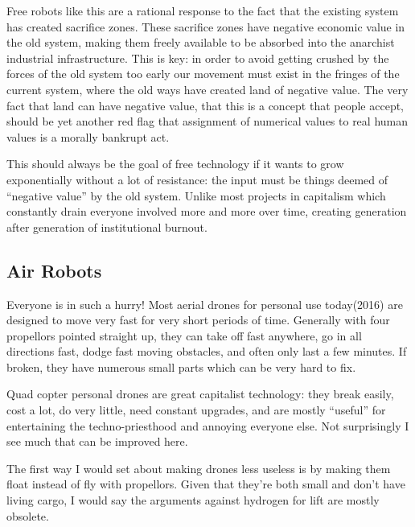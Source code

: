 Free robots like this are a rational response to the fact that the
existing system has created sacrifice zones. These sacrifice zones have
negative economic value in the old system, making them freely available
to be absorbed into the anarchist industrial infrastructure. This is
key: in order to avoid getting crushed by the forces of the old system
too early our movement must exist in the fringes of the current system,
where the old ways have created land of negative value. The very fact
that land can have negative value, that this is a concept that people
accept, should be yet another red flag that assignment of numerical
values to real human values is a morally bankrupt act.

This should always be the goal of free technology if it wants to grow
exponentially without a lot of resistance: the input must be things
deemed of ``negative value'' by the old system. Unlike most projects in
capitalism which constantly drain everyone involved more and more over
time, creating generation after generation of institutional burnout.

\subsection{Air Robots}\label{air-robots}

Everyone is in such a hurry! Most aerial drones for personal use
today(2016) are designed to move very fast for very short periods of
time. Generally with four propellors pointed straight up, they can take
off fast anywhere, go in all directions fast, dodge fast moving
obstacles, and often only last a few minutes. If broken, they have
numerous small parts which can be very hard to fix.

Quad copter personal drones are great capitalist technology: they break
easily, cost a lot, do very little, need constant upgrades, and are
mostly ``useful'' for entertaining the techno-priesthood and annoying
everyone else. Not surprisingly I see much that can be improved here.

The first way I would set about making drones less useless is by making
them float instead of fly with propellors. Given that they're both small
and don't have living cargo, I would say the arguments against hydrogen
for lift are mostly obsolete.

